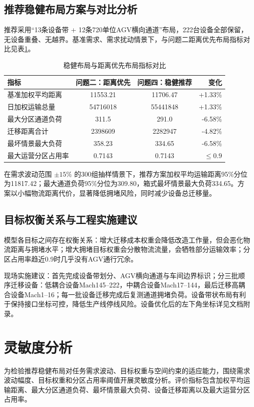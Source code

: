 \documentclass[12pt,a4paper]{article}
\begin{document}
\subsection{推荐稳健布局方案与对比分析}
推荐采用“13条设备带 + 12条720单位AGV横向通道”布局，222台设备全部保留，无设备重叠、无越界。基准需求、需求扰动情景下，与问题二距离优先布局指标对比见表\ref{tab:robust_compare}。

\begin{table}[htbp]
	\centering
	\caption{稳健布局与距离优先布局指标对比}
	\label{tab:robust_compare}
	\begin{tabular}{lccr}
		\toprule
		指标 & 问题二：距离优先 & 问题四：稳健推荐 & 变化 \\
		\midrule
		基准加权平均距离 & 11553.21 & 11706.47 & +1.33\% \\
		日加权运输总量 & 54716018 & 55441848 & +1.33\% \\
		最大分区通道负荷 & 311.5 & 291.0 & -6.58\% \\
		迁移距离合计 & 2398609 & 2282947 & -4.82\% \\
		最坏情景最大负荷 & 358.23 & 334.65 & -6.58\% \\
		最大运营分区占用率 & 0.7143 & 0.7143 & $\le 0.9$ \\
		\bottomrule
	\end{tabular}
\end{table}

在需求波动范围 $\pm 15\%$ 的300组抽样情景下，推荐方案加权平均运输距离95\%分位为11817.42；最大通道负荷95\%分位为309.80，箱式最坏情景最大负荷334.65。方案以小幅物流距离代价，显著降低拥堵风险，同时减少设备总迁移量。

\subsection{目标权衡关系与工程实施建议}
模型各目标之间存在权衡关系：增大迁移成本权重会降低改造工作量，但会恶化物流距离与拥堵水平；增大拥堵目标权重会分散物流流量，会牺牲部分运输效率；分区占用率趋近0.9时几乎没有AGV通行冗余。

现场实施建议：首先完成设备带划分、AGV横向通道与车间边界标识；分三批顺序迁移设备：低耦合设备Mach145--222，中耦合设备Mach17--144，最后迁移高耦合设备Mach1--16；每一批设备迁移完成后复测通道拥堵负荷。设备带状布局有利于保持接口坐标可控，降低生产线停线风险。设备优化后的左下角坐标详见文档附录。
	
	\section{灵敏度分析}
	为检验推荐稳健布局对任务需求波动、目标权重与空间约束的适应能力，围绕需求波动幅度、目标权重和分区占用率阈值开展灵敏度分析。评价指标包含加权平均运输距离、最大分区通道负荷、最坏情景最大负荷、设备迁移距离以及最大运营分区占用率。
	
\end{document}
